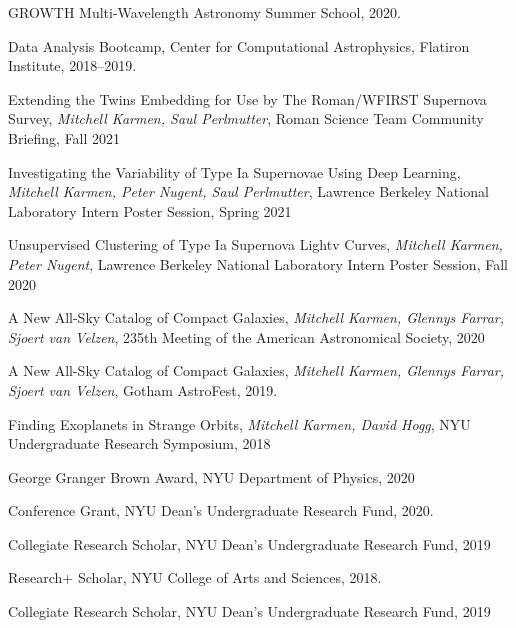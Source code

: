 \documentclass[12pt,letterpaper]{article}
\begin{document}
\begin{list}{}{\cvlist}

\item
  GROWTH Multi-Wavelength Astronomy Summer School, 2020.


\item
  Data Analysis Bootcamp, Center for Computational Astrophysics, Flatiron Institute, 2018--2019.

\end{list}

\begin{list}{}{\cvlist}

\item
  Extending the Twins Embedding for Use by The Roman/WFIRST Supernova Survey, \textit{Mitchell Karmen, Saul Perlmutter}, Roman Science Team Community Briefing, Fall 2021

\item
  Investigating the Variability of Type Ia Supernovae Using Deep Learning, \textit{Mitchell Karmen, Peter Nugent, Saul Perlmutter}, Lawrence Berkeley National Laboratory Intern Poster Session, Spring 2021
\item
  Unsupervised Clustering of Type Ia Supernova Lightv Curves, \textit{Mitchell Karmen, Peter Nugent}, Lawrence Berkeley National Laboratory Intern Poster Session, Fall 2020

\item
  A New All-Sky Catalog of Compact Galaxies, \textit{Mitchell Karmen, Glennys Farrar, Sjoert van Velzen}, 235th Meeting of the American Astronomical Society, 2020

\item
  A New All-Sky Catalog of Compact Galaxies, \textit{Mitchell Karmen, Glennys Farrar, Sjoert van Velzen}, Gotham AstroFest, 2019.

\item
  Finding Exoplanets in Strange Orbits, \textit{Mitchell Karmen, David Hogg}, NYU Undergraduate Research Symposium, 2018

\end{list}


\begin{list}{}{\cvlist}

\item
  George Granger Brown Award, NYU Department of Physics, 2020

\item
  Conference Grant, NYU Dean's Undergraduate Research Fund, 2020.

\item
  Collegiate Research Scholar, NYU Dean's Undergraduate Research Fund, 2019

\item
  Research+ Scholar, NYU College of Arts and Sciences, 2018.

\item
  Collegiate Research Scholar, NYU Dean's Undergraduate Research Fund, 2019

\end{list}
\end{document}
